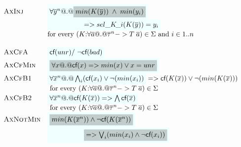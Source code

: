 \documentclass[preprint,nocopyrightspace,draft]{sigplanconf}
\begin{document}
{\[\begin{array}{c}
\begin{array}{lll}
 \textsc{AxInj}   & \formula{\forall \oln{y}{n} @.@ \highlight{min(K(\ys))\;\land\; min(y_i)}} \\ 
                  & \formula{\quad\qquad\qquad => \sel{K}{i}(K(\ys)) = y_i} \\ 
                  & \text{for every } (K{:}\forall\as @.@ \oln{\tau}{n} -> T\;\as) \in \Sigma \text{ and } i \in 1..n \\ \\

 \textsc{AxCfA}    & \formula{\lcf{\unr} /\ \lncf{\bad}} \\
 \textsc{AxCfMin}  & \formula{\highlight{\forall x @.@ \lcf{x} => min(x) \lor x = unr}} \\
 \textsc{AxCfB1}   & \formula{\forall \oln{x}{n} @.@ \bigwedge_i (\lcf{x_i}\lor \neg(min(x_i))} => \lcf{K(\ol{x})} \lor \neg(min(K(\ol{x}))) \\
                   & \text{ for every } (K{:}\forall\as @.@ \oln{\tau}{n} -> T\;\as) \in \Sigma \\ 
 \textsc{AxCfB2}   & \formula{\forall \oln{x}{n} @.@ \lcf{K(\ol{x})}  => \bigwedge\lcf{\ol{x}}} \\
                   & \text{ for every } (K{:}\forall\as @.@ \oln{\tau}{n} -> T\;\as) \in \Sigma \\
 \textsc{AxNotMin} & \formula{\highlight{min(K(\oln{x}{n}))\land\neg\lcf{K(\oln{x}{n})}}} \\ 
                   & \formula{\quad\qquad\qquad \highlight{ => \bigvee_i (min(x_i)\land\neg\lcf{x_i})}}
\end{array}
\end{array}\]}
\end{document}
